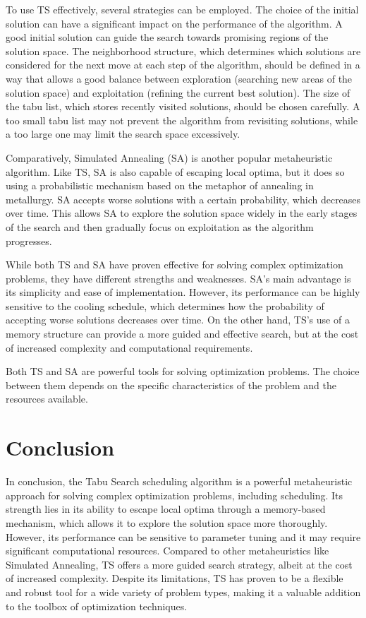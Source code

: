 \documentclass[conference]{IEEEtran}
\begin{document}
To use TS effectively, several strategies can be employed. The choice of the initial solution can have a significant impact on the performance of the algorithm. A good initial solution can guide the search towards promising regions of the solution space. The neighborhood structure, which determines which solutions are considered for the next move at each step of the algorithm, should be defined in a way that allows a good balance between exploration (searching new areas of the solution space) and exploitation (refining the current best solution). The size of the tabu list, which stores recently visited solutions, should be chosen carefully. A too small tabu list may not prevent the algorithm from revisiting solutions, while a too large one may limit the search space excessively.

Comparatively, Simulated Annealing (SA) is another popular metaheuristic algorithm. Like TS, SA is also capable of escaping local optima, but it does so using a probabilistic mechanism based on the metaphor of annealing in metallurgy. SA accepts worse solutions with a certain probability, which decreases over time. This allows SA to explore the solution space widely in the early stages of the search and then gradually focus on exploitation as the algorithm progresses.

While both TS and SA have proven effective for solving complex optimization problems, they have different strengths and weaknesses. SA's main advantage is its simplicity and ease of implementation. However, its performance can be highly sensitive to the cooling schedule, which determines how the probability of accepting worse solutions decreases over time. On the other hand, TS's use of a memory structure can provide a more guided and effective search, but at the cost of increased complexity and computational requirements.

Both TS and SA are powerful tools for solving optimization problems. The choice between them depends on the specific characteristics of the problem and the resources available.

\section{Conclusion}

In conclusion, the Tabu Search scheduling algorithm is a powerful metaheuristic approach for solving complex optimization problems, including scheduling. Its strength lies in its ability to escape local optima through a memory-based mechanism, which allows it to explore the solution space more thoroughly. However, its performance can be sensitive to parameter tuning and it may require significant computational resources. Compared to other metaheuristics like Simulated Annealing, TS offers a more guided search strategy, albeit at the cost of increased complexity. Despite its limitations, TS has proven to be a flexible and robust tool for a wide variety of problem types, making it a valuable addition to the toolbox of optimization techniques.



\end{document}
